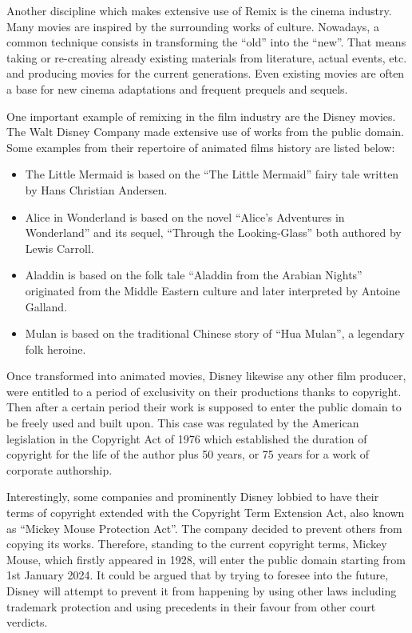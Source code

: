 Another discipline which makes extensive use of Remix is the cinema industry. Many movies are inspired by the surrounding works of culture. Nowadays, a common technique consists in transforming the “old” into the “new”. That means taking or re-creating already existing materials from literature, actual events, etc. and producing movies for the current generations. Even existing movies are often a base for new cinema adaptations and frequent prequels and sequels.

One important example of remixing in the film industry are the Disney movies. The Walt Disney Company made extensive use of works from the public domain. Some examples from their repertoire of animated films history are listed below:

\begin{itemize}
\item The Little Mermaid is based on the “The Little Mermaid” fairy tale written by Hans Christian Andersen.
\item Alice in Wonderland is based on the novel “Alice's Adventures in Wonderland” and its sequel, “Through the Looking-Glass” both authored by Lewis Carroll.
\item Aladdin is based on the folk tale “Aladdin from the Arabian Nights” originated from the Middle Eastern culture and later interpreted by Antoine Galland.
\item Mulan is based on the traditional Chinese story of “Hua Mulan”, a legendary folk heroine. 
\end{itemize}

Once transformed into animated movies, Disney likewise any other film producer, were entitled to a period of exclusivity on their productions thanks to copyright. Then after a certain period their work is supposed to enter the public domain to be freely used and built upon. This case was regulated by the American legislation in the Copyright Act of 1976 which established the duration of copyright for the life of the author plus 50 years, or 75 years for a work of corporate authorship.

Interestingly, some companies and prominently Disney lobbied to have their terms of copyright extended with the Copyright Term Extension Act, also known as “Mickey Mouse Protection Act”. The company decided to prevent others from copying its works. Therefore, standing to the current copyright terms, Mickey Mouse, which firstly appeared in 1928, will enter the public domain starting from 1st January 2024. It could be argued that by trying to foresee into the future, Disney will attempt to prevent it from happening by using other laws including trademark protection and using precedents in their favour from other court verdicts.


